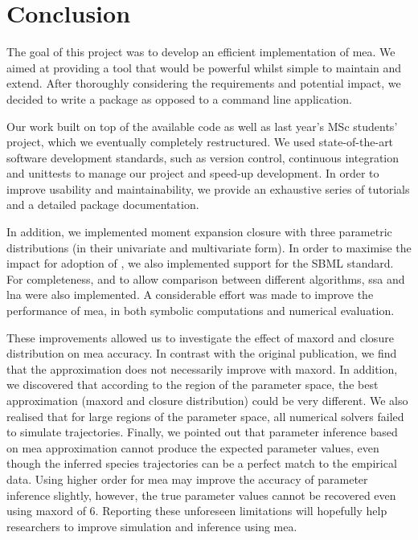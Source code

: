 \section{Conclusion} \label{sec:conclus}

The goal of this project was to develop an efficient \py{} implementation of \acrlong{mea}.
We aimed at providing a tool that would be powerful whilst simple to maintain and extend.
After thoroughly considering the requirements and potential impact, we decided to write a \py{} package as opposed to a command line application.

Our work built on top of the available \mat{} code as well as last year's MSc students' project, which we eventually completely restructured.
We used state-of-the-art software development standards, such as version control, continuous integration and unittests to manage our project and speed-up development.
In order to improve usability and maintainability, we provide an exhaustive series of tutorials and a detailed package documentation.

In addition, we implemented moment expansion closure with three parametric distributions (in their univariate and multivariate form).
In order to maximise the impact for adoption of \means, we also implemented support for the SBML standard.
For completeness, and to allow comparison between different algorithms, \gls{ssa} and \gls{lna} were also implemented.
A considerable effort was made to improve the performance of \gls{mea},  in both symbolic computations and numerical evaluation.

These improvements allowed us to investigate the effect of \gls{maxord} and closure distribution on \gls{mea} accuracy.
In contrast with the original publication, we find that the approximation does not necessarily improve with \gls{maxord}.
In addition, we discovered that according to the region of the parameter space, the best approximation (\gls{maxord} and closure distribution) could be very different.
We also realised that for large regions of the parameter space, all numerical solvers failed to simulate trajectories.
Finally, we pointed out that parameter inference based on \gls{mea} approximation cannot produce the expected parameter values, even though the inferred species trajectories can be a perfect match to the empirical data. Using higher order for \gls{mea} may improve the accuracy of parameter inference slightly, however, the true parameter values cannot be recovered even using \gls{maxord} of 6.
Reporting these unforeseen limitations will hopefully help researchers to improve simulation and inference using \gls{mea}.


